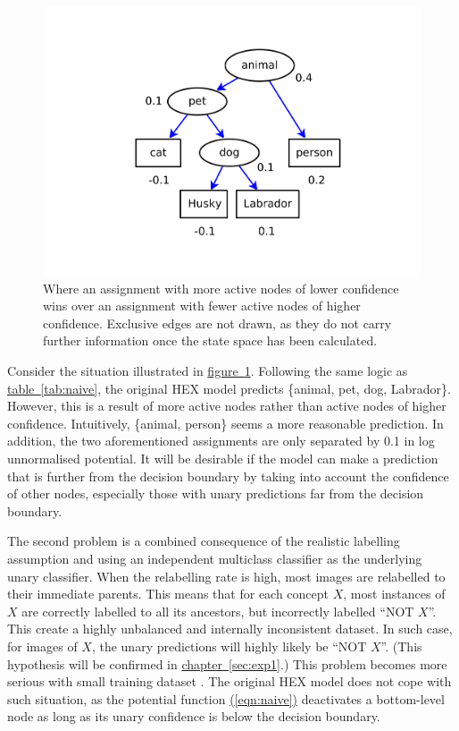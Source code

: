 \documentclass[11pt,a4paper]{book}
\begin{document}
\begin{figure}[htbp]
\centering\includegraphics[scale=0.5]{depth.pdf}
\caption{Where an assignment with more active nodes of lower confidence wins over an assignment with fewer active nodes of higher confidence. Exclusive edges are not drawn, as they do not carry further information once the state space has been calculated.}
\label{fig:depth}
\end{figure}

Consider the situation illustrated in \hyperref[fig:depth]{figure~\ref{fig:depth}}. Following the same logic as \hyperref[tab:naive]{table~\ref{tab:naive}}, the original HEX model predicts \{animal, pet, dog, Labrador\}. However, this is a result of more active nodes rather than active nodes of higher confidence. Intuitively, \{animal, person\} seems a more reasonable prediction. In addition, the two aforementioned assignments are only separated by 0.1 in log unnormalised potential. It will be desirable if the model can make a prediction that is further from the decision boundary by taking into account the confidence of other nodes, especially those with unary predictions far from the decision boundary.

The second problem is a combined consequence of the realistic labelling assumption and using an independent multiclass classifier as the underlying unary classifier. When the relabelling rate is high, most images are relabelled to their immediate parents. This means that for each concept $X$, most instances of $X$ are correctly labelled to all its ancestors, but incorrectly labelled ``NOT $X$''. This create a highly unbalanced and internally inconsistent dataset. In such case, for images of $X$, the unary predictions will highly likely be ``NOT $X$''. (This hypothesis will be confirmed in \hyperref[sec:exp1]{chapter~\ref{sec:exp1}}.) This problem becomes more serious with small training dataset \cite{he2009learning}. The original HEX model does not cope with such situation, as the potential function \hyperref[eqn:naive]{(\ref{eqn:naive})} deactivates a bottom-level node as long as its unary confidence is below the decision boundary.
\end{document}
